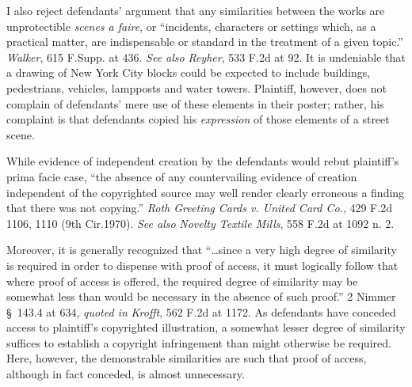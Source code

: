 I also reject defendants' argument that any similarities between the works are
unprotectible \textit{scenes a faire}, or ``incidents, characters or settings
which, as a practical matter, are indispensable or standard in the treatment of
a given topic.'' \textit{Walker}, 615 F.Supp. at 436. \textit{See also}
\textit{Reyher}, 533 F.2d at 92. It is undeniable that a drawing of New York
City blocks could be expected to include buildings, pedestrians, vehicles,
lampposts and water towers. Plaintiff, however, does not complain of defendants'
mere use of these elements in their poster; rather, his complaint is that
defendants  copied his \textit{expression} of those elements of a street scene.

While evidence of independent creation by the defendants would rebut plaintiff's
prima facie case, ``the absence of any countervailing evidence of creation
independent of the copyrighted source may well render clearly erroneous a
finding that there was not copying.'' \textit{Roth Greeting Cards v. United Card
Co.}, 429 F.2d 1106, 1110 (9th Cir.1970). \textit{See also} \textit{Novelty
Textile Mills}, 558 F.2d at 1092 n. 2.

Moreover, it is generally recognized that ``\ldots since a very high degree of
similarity is required in order to dispense with proof of access, it must
logically follow that where proof of access is offered, the required degree of
similarity may be somewhat less than would be necessary in the absence of such
proof.'' 2 Nimmer \S~143.4 at 634, \textit{quoted in} \textit{Krofft}, 562 F.2d
at 1172. As defendants have conceded access to plaintiff's copyrighted
illustration, a somewhat lesser degree of similarity suffices to establish a
copyright infringement than might otherwise be required. Here, however, the
demonstrable similarities are such that proof of access, although in fact
conceded, is almost unnecessary.



